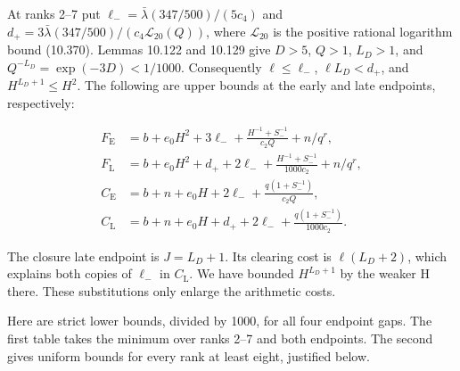 \documentclass[
  11pt,
  a4paper,
]{article}
\begin{document}
At ranks 2--7 put \(\ell_-=\bar\lambda(347/500)/(5c_4)\) and
\(d_+=3\bar\lambda(347/500)/(c_4\mathcal L_{20}(Q))\), where
\(\mathcal L_{20}\) is the positive rational logarithm bound (10.370).
Lemmas 10.122 and 10.129 give \(D>5\), \(Q>1\), \(L_D>1\), and
\(Q^{-L_D}=\exp(-3D)<1/1000\). Consequently \(\ell\le\ell_-\),
\(\ell L_D<d_+\), and \(H^{L_D+1}\le H^2\). The following are upper
bounds at the early and late endpoints, respectively:

\[
\begin{aligned}
F_{\mathrm E}&=b+e_0H^2+3\ell_-
+\frac{H^{-1}+S_-^{-1}}{c_2Q}+n/q^r,\\
F_{\mathrm L}&=b+e_0H^2+d_++2\ell_-
+\frac{H^{-1}+S_-^{-1}}{1000c_2}+n/q^r,\\
C_{\mathrm E}&=b+n+e_0H+2\ell_-
+\frac{q(1+S_-^{-1})}{c_2Q},\\
C_{\mathrm L}&=b+n+e_0H+d_++2\ell_-
+\frac{q(1+S_-^{-1})}{1000c_2}.
\end{aligned}
\tag{10.385}
\]

The closure late endpoint is \(J=L_D+1\). Its clearing cost is
\(\ell(L_D+2)\), which explains both copies of \(\ell_-\) in
\(C_{\mathrm L}\). We have bounded \(H^{L_D+1}\) by the weaker H there.
These substitutions only enlarge the arithmetic costs.

Here are strict lower bounds, divided by 1000, for all four endpoint
gaps. The first table takes the minimum over ranks 2--7 and both
endpoints. The second gives uniform bounds for every rank at least
eight, justified below.
\end{document}
